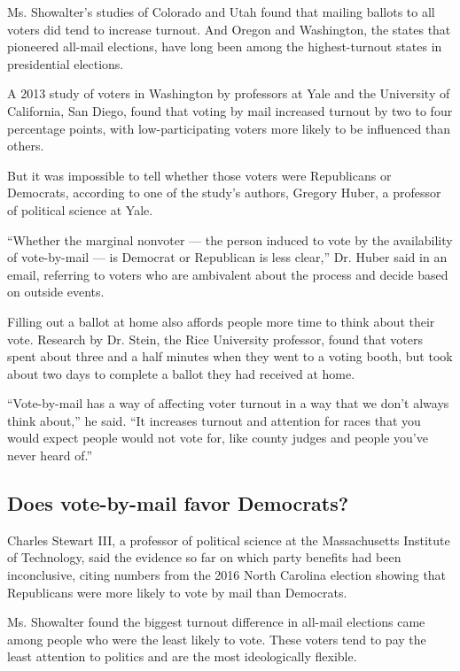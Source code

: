 Ms. Showalter's studies of Colorado and Utah found that mailing ballots
to all voters did tend to increase turnout. And Oregon and Washington,
the states that pioneered all-mail elections, have long been among the
highest-turnout states in presidential elections.

A 2013 study of voters in Washington by professors at Yale and the
University of California, San Diego, found that voting by mail increased
turnout by two to four percentage points, with low-participating voters
more likely to be influenced than others.

But it was impossible to tell whether those voters were Republicans or
Democrats, according to one of the study's authors, Gregory Huber, a
professor of political science at Yale.

``Whether the marginal nonvoter --- the person induced to vote by the
availability of vote-by-mail --- is Democrat or Republican is less
clear,'' Dr. Huber said in an email, referring to voters who are
ambivalent about the process and decide based on outside events.

Filling out a ballot at home also affords people more time to think
about their vote. Research by Dr. Stein, the Rice University professor,
found that voters spent about three and a half minutes when they went to
a voting booth, but took about two days to complete a ballot they had
received at home.

``Vote-by-mail has a way of affecting voter turnout in a way that we
don't always think about,'' he said. ``It increases turnout and
attention for races that you would expect people would not vote for,
like county judges and people you've never heard of.''

\hypertarget{does-vote-by-mail-favor-democrats}{%
\subsection{Does vote-by-mail favor
Democrats?}\label{does-vote-by-mail-favor-democrats}}

Charles Stewart III, a professor of political science at the
Massachusetts Institute of Technology, said the evidence so far on which
party benefits had been inconclusive, citing numbers from the 2016 North
Carolina election showing that Republicans were more likely to vote by
mail than Democrats.

Ms. Showalter found the biggest turnout difference in all-mail elections
came among people who were the least likely to vote. These voters tend
to pay the least attention to politics and are the most ideologically
flexible.

